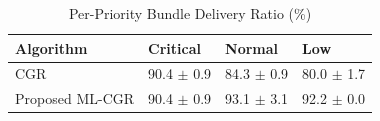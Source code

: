 \begin{table}[t]
\centering
\caption{Per-Priority Bundle Delivery Ratio (\%)}
\label{tab:priority}
\begin{tabular}{llll}
\hline
\textbf{Algorithm} & \textbf{Critical} & \textbf{Normal} & \textbf{Low} \\
\hline
CGR & 90.4 $\pm$ 0.9 & 84.3 $\pm$ 0.9 & 80.0 $\pm$ 1.7 \\
Proposed ML-CGR & 90.4 $\pm$ 0.9 & 93.1 $\pm$ 3.1 & 92.2 $\pm$ 0.0 \\
\hline
\end{tabular}
\end{table}

